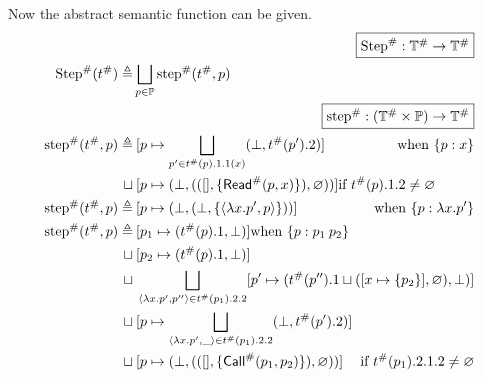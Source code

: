 Now the abstract semantic function can be given.
\begin{align*}
                                     & \pushright{\fbox{$\Abs\Step:\Abs{\mathbb{T}}\rightarrow\Abs{\mathbb{T}}$}}                                                                             \\
  \Abs\Step(\Abs\ptree)   \triangleq & \bigsqcup_{p\in\mathbb{P}}\Abs\step(\Abs\ptree,p)                                                                                                      \\
                                     & \pushright{\fbox{$\Abs\step:(\Abs{\mathbb{T}}\times\mathbb{P})\rightarrow\Abs{\mathbb{T}}$}}                                                           \\
  \Abs\step(\Abs\ptree,p) \triangleq & \specialcell{\:[p\mapsto\bigsqcup_{p'\in\Abs\ptree(p).1.1(x)}(\bot,\Abs\ptree(p').2)]\hfill\textnormal{when }\plabel{p}{x}}                            \\
  \sqcup                             & \: [p\mapsto(\bot,(([],\{\Abs\ReadE(p,x)\}),\varnothing))]\hfill\textnormal{if }\Abs\ptree(p).1.2\neq\varnothing                                       \\
  \Abs\step(\Abs\ptree,p) \triangleq & \specialcell{\:[p\mapsto(\bot,(\bot,\{\langle\lambda x.p',p\rangle\}))]\hfill\textnormal{when }\plabel{p}{\lambda x.p'}}                               \\
  \Abs\step(\Abs\ptree,p) \triangleq & \: [p_1\mapsto(\Abs\ptree(p).1,\bot)]\hfill\textnormal{when }\plabel{p}{p_1\:p_2}                                                                      \\
  \sqcup                             & \: [p_2\mapsto(\Abs\ptree(p).1,\bot)]                                                                                                                  \\
  \sqcup                             & \: \bigsqcup_{\langle\lambda x.p',p''\rangle\in\Abs\ptree(p_1).2.2}[p'\mapsto(\Abs\ptree(p'').1\sqcup([x\mapsto\{p_2\}],\varnothing),\bot)]            \\
  \sqcup                             & \: [p\mapsto\bigsqcup_{\langle\lambda x.p',\_\rangle\in\Abs\ptree(p_1).2.2}(\bot,\Abs\ptree(p').2)]                                                    \\
  \sqcup                             & \specialcell{\:[p\mapsto(\bot,(([],\{\Abs\CallE(p_1,p_2)\}),\varnothing))]\hfill\textnormal{if }\Abs\ptree(p_1).2.1.2\neq\varnothing}                  \\

\end{align*}
